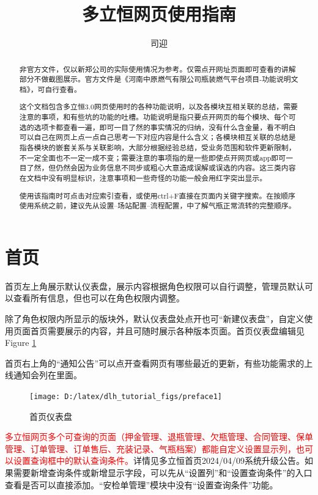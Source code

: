 \documentclass[UTF8]{ctexart}
\title{多立恒网页使用指南}
\author{司迎}
\begin{document}
\maketitle
\tableofcontents
\begin{abstract}
非官方文件，仅以新郑公司的实际使用情况为参考。仅需点开网址页面即可查看的讲解部分不做截图展示。官方文件是《河南中原燃气有限公司瓶装燃气平台项目-功能说明文档》，可自行查看。

这个文档包含多立恒3.0网页使用时的各种功能说明，以及各模块互相关联的总结，需要注意的事项，和有些坑的功能的吐槽。功能说明是指只要点开网页的每个模块、每个可选的选项卡都查看一遍，即可一目了然的事实情况的归纳，没有什么含金量，看不明白可以自己在网页上点一点自己思考一下对应内容是什么含义；各模块相互关联的总结是指各模块的嵌套关系与关联影响，大部分根据经验总结，受业务范围和软件更新限制，不一定全面也不一定一成不变；需要注意的事项指的是一些即使点开网页或app即可一目了然，但仍然会因为业务信息不同步或粗心大意造成误解或误选的内容。这三类内容在文档中没有明显标识，注意事项和一些奇怪的功能一般会用红字突出显示。

使用该指南时可点击对应索引查看，或使用ctrl+F直接在页面内关键字搜索。在按顺序使用系统之前，建议先从设置--场站配置--流程配置，中了解气瓶正常流转的完整顺序。
\end{abstract}

\section{首页}

首页左上角展示默认仪表盘，展示内容根据角色权限可以自行调整，管理员默认可以查看所有信息，但也可以在角色权限内调整。

除了角色权限内所显示的版块外，默认仪表盘处点开也可“新建仪表盘”，自定义使用页面首页需要展示的内容，并且可随时展示各种版本页面。首页仪表盘编辑见Figure \ref{fig:preface1}

首页右上角的“通知公告”可以点开查看网页有哪些最近的更新，有些功能需求的上线通知会列在里面。
\begin{figure}[h]
	\centering
	\texttt{[image: D:/latex/dlh\_tutorial\_figs/preface1]}
	\caption{首页仪表盘}
	\label{fig:preface1}
\end{figure}

\textcolor{red}{多立恒网页多个可查询的页面（押金管理、退瓶管理、欠瓶管理、合同管理、保单管理、订单管理、订单售后、充装记录、气瓶档案）都能自定义设置显示列，也可以设置查询框中的默认查询条件。}详情见多立恒首页2024/04/09系统升级公告。如果需要新增查询条件或新增显示字段，可以先从“设置列”和“设置查询条件”的入口查看是否可以直接添加。“安检单管理”模块中没有“设置查询条件”功能。
\end{document}
